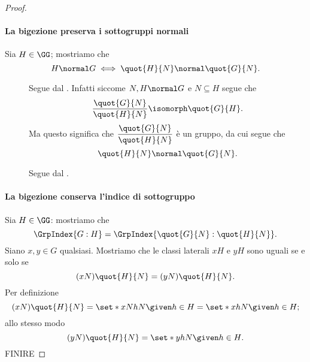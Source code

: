 \begin{proof}
    \paragraph{La bigezione preserva i sottogruppi normali} Sia $H \in \GG$; mostriamo che \[
        H \normal G \iff \quot{H}{N} \normal \quot{G}{N}.    
    \] \begin{description}
        \item[\boximpl ] Segue dal . Infatti siccome $N, H \normal G$ e $N \subseteq H$ segue che \[
            \frac{\quot{G}{N}}{\quot{H}{N}} \isomorph \quot{G}{H}.    
        \] Ma questo significa che $\dfrac{\quot{G}{N}}{\quot{H}{N}}$ è un gruppo, da cui segue che \[
            \quot{H}{N} \normal \quot{G}{N}.
        \]
        \item[\boximplby] Segue dal .
    \end{description}

    \paragraph{La bigezione conserva l'indice di sottogruppo} Sia $H \in \GG$: mostriamo che \[
        \GrpIndex{G : H} = \GrpIndex{\quot{G}{N} : \quot{H}{N}}.    
    \] Siano $x, y \in G$ qualsiasi. Mostriamo che le classi laterali $xH$ e $yH$ sono uguali se e solo se \[
        (xN)\quot{H}{N} = (yN)\quot{H}{N}.    
    \] Per definizione \[
        (xN)\quot{H}{N} = \set*{xNhN \given h \in H} = \set*{xhN \given h \in H};    
    \] allo stesso modo \[
        (yN)\quot{H}{N} = \set*{yhN \given h \in H}.    
    \] FINIRE
\end{proof}
